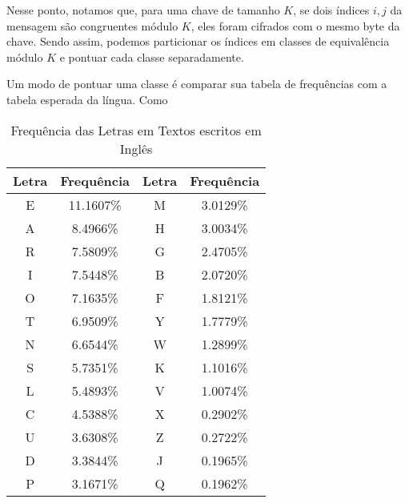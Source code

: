 \documentclass[conference]{IEEEtran}
\begin{document}
Nesse ponto, notamos que, para uma chave de tamanho $K$, se dois índices $i, j$ da
mensagem são congruentes módulo $K$, eles foram cifrados com o mesmo byte da
chave. Sendo assim, podemos particionar os índices em classes de equivalência
módulo $K$ e pontuar cada classe separadamente.

Um modo de pontuar uma classe é comparar sua tabela de frequências com a tabela
esperada da língua. Como 

\begin{table}[htbp]
\caption{Frequência das Letras em Textos escritos em Inglês}
\begin{center}
\begin{tabular}{|c|c|c|c|}
\hline
    Letra & Frequência & Letra & Frequência \\
\hline
    E & 11.1607\% & M & 3.0129\% \\
    A & 8.4966\% & H & 3.0034\% \\
    R & 7.5809\% & G & 2.4705\% \\
    I & 7.5448\% & B & 2.0720\% \\
    O & 7.1635\% & F & 1.8121\% \\
    T & 6.9509\% & Y & 1.7779\% \\
    N & 6.6544\% & W & 1.2899\% \\
    S & 5.7351\% & K & 1.1016\% \\
    L & 5.4893\% & V & 1.0074\% \\
    C & 4.5388\% & X & 0.2902\% \\
    U & 3.6308\% & Z & 0.2722\% \\
    D & 3.3844\% & J & 0.1965\% \\
    P & 3.1671\% & Q & 0.1962\% \\
\hline
\end{tabular}
\label{tab:englishfrequency}
\end{center}
\end{table}

\end{document}
